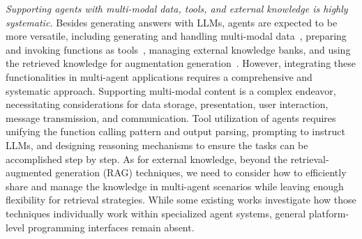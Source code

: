 \textit{Supporting agents with multi-modal data, tools, and external knowledge is highly systematic.} 
Besides generating answers with LLMs, agents are expected to be more versatile, including generating and handling multi-modal data~\citep{multimodal, dalle3}, preparing and invoking functions as tools~\citep{react, shen2024small}, managing external knowledge banks, and using the retrieved knowledge for augmentation generation~\citep{lewis2020retrieval}.
However, integrating these functionalities in multi-agent applications requires a comprehensive and systematic approach. 
Supporting multi-modal content is a complex endeavor, necessitating considerations for data storage, presentation, user interaction, message transmission, and communication. 
Tool utilization of agents requires unifying the function calling pattern and output parsing, prompting to instruct LLMs, and designing reasoning mechanisms to ensure the tasks can be accomplished step by step.
As for external knowledge, beyond the retrieval-augmented generation (RAG) techniques, we need to consider how to efficiently share and manage the knowledge in multi-agent scenarios while leaving enough flexibility for retrieval strategies.
While some existing works investigate how those techniques individually work within specialized agent systems, general platform-level programming interfaces remain absent.

